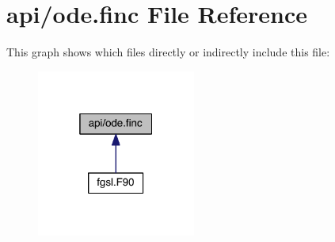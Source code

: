 \hypertarget{ode_8finc}{\section{api/ode.finc File Reference}
\label{ode_8finc}
}
This graph shows which files directly or indirectly include this file\-:\nopagebreak
\begin{figure}[H]
\begin{center}
\leavevmode
\includegraphics[width=148pt]{ode_8finc__dep__incl}
\end{center}
\end{figure}
